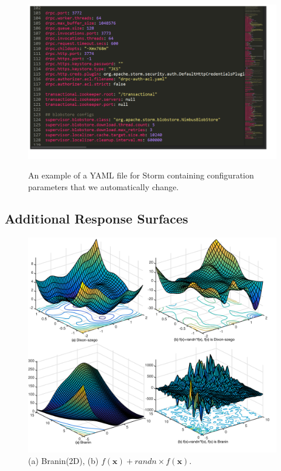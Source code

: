 \documentclass[letter]{vldb}
\renewcommand{\mathbf}[1]{{\boldsymbol #1}}
\begin{document}
\begin{figure}[h!]
	\begin{center}
		\vspace{-2em}
		\includegraphics[width=1.1\columnwidth]{figures/config-params}
			\vspace{-3em}
		\caption{An example of a {\sf YAML} file for Storm containing configuration parameters that we automatically change.}
		\vspace{-2em}
		\label{fig:yaml-example}
		
	\end{center}
\end{figure}


\newpage

\subsection{Additional Response Surfaces}

\begin{figure}[h!] 
	\begin{center}
		\includegraphics[width=\columnwidth]{figures/dixon-branin-randn}
		\caption{(a) {\sf Branin(2D)}, (b) $f(\mathbf{x})+randn\times f(\mathbf{x})$.}
		\label{fig:dixon-rand-surface}
	\end{center}
\end{figure}
\end{document}
